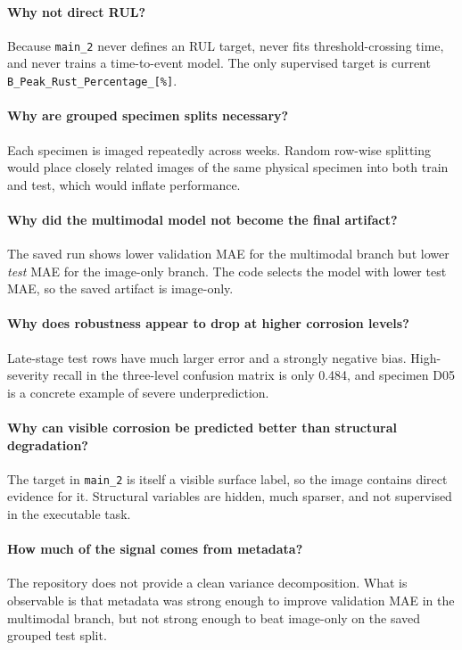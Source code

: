 \documentclass[11pt]{article}
\begin{document}
\paragraph{Why not direct RUL?}
Because \texttt{main\_2} never defines an RUL target, never fits threshold-crossing time, and never trains a time-to-event model. The only supervised target is current \texttt{B\_Peak\_Rust\_Percentage\_[\%]}.

\paragraph{Why are grouped specimen splits necessary?}
Each specimen is imaged repeatedly across weeks. Random row-wise splitting would place closely related images of the same physical specimen into both train and test, which would inflate performance.

\paragraph{Why did the multimodal model not become the final artifact?}
The saved run shows lower validation MAE for the multimodal branch but lower \emph{test} MAE for the image-only branch. The code selects the model with lower test MAE, so the saved artifact is image-only.

\paragraph{Why does robustness appear to drop at higher corrosion levels?}
Late-stage test rows have much larger error and a strongly negative bias. High-severity recall in the three-level confusion matrix is only 0.484, and specimen D05 is a concrete example of severe underprediction.

\paragraph{Why can visible corrosion be predicted better than structural degradation?}
The target in \texttt{main\_2} is itself a visible surface label, so the image contains direct evidence for it. Structural variables are hidden, much sparser, and not supervised in the executable task.

\paragraph{How much of the signal comes from metadata?}
The repository does not provide a clean variance decomposition. What is observable is that metadata was strong enough to improve validation MAE in the multimodal branch, but not strong enough to beat image-only on the saved grouped test split.
\end{document}
